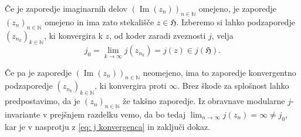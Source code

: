\documentclass[mat1]{fmfdelo}
\numberwithin{equation}{section}
\newcommand{\N}{\mathbb N}
\newcommand{\Z}{\mathbb Z}
\newcommand{\HH}{\mathfrak{H}}
\newcommand{\abs}[1]{\left\lvert #1 \right\rvert}
\renewcommand\Re{\operatorname{Re}}%
\renewcommand\Im{\operatorname{Im}}%
\theoremstyle{definition}
\begin{document}
\begin{dokaz}
    Če je zaporedje imaginarnih delov $(\Im(z_n))_{n \in \N}$ omejeno, je zaporedje $(z_n)_{n\in \N}$ omejeno in ima zato stekališče $z \in \HH$. Izberemo si lahko podzaporedje $(z_{n_k})_{k\in\N}$, ki konvergira k $z$, od koder zaradi zveznosti $j$, velja
    \[
        j_0 = \lim_{k \to \infty}j(z_{n_k}) = j(z) \in j(\HH).  
    \] 

    Če pa je zaporedje $(\Im(z_n))_{n \in \N}$ neomejeno, ima to zaporedje konvergentno podzaporedje $(z_{n_k})_{k \in \N}$, ki konvergira proti $\infty$. 
    Brez škode za splošnost lahko predpostavimo, da je $(z_n)_{n \in \N}$ že takšno zaporedje. Iz obravnave modularne $j$-invariante v prejšnjem razdelku vemo, da bo tedaj $\lim_{n \to \infty}j(z_n) = \infty \neq j_0$, kar je v nasprotju z \eqref{eq: j konvergenca} in zaključi dokaz.
\end{dokaz}
\end{document}
